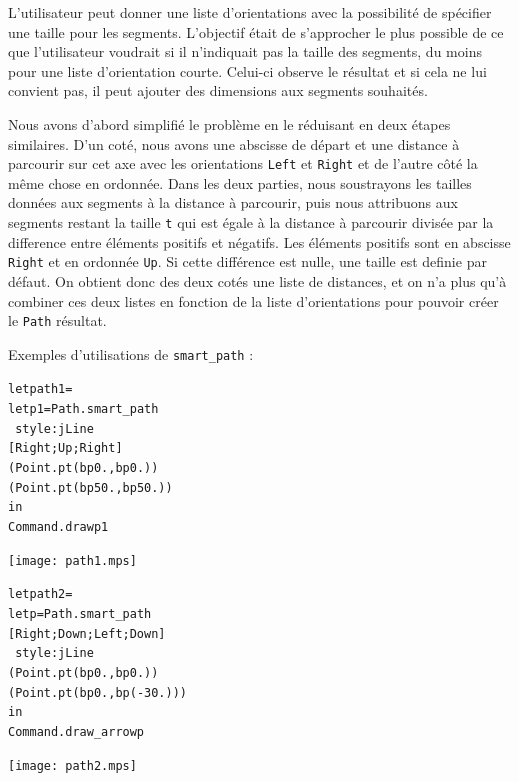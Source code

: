 \documentclass[a4paper,12pt]{article}
\begin{document}
L'utilisateur peut donner une liste d'orientations avec la possibilité de spécifier une taille pour les segments.
L'objectif était de s'approcher le plus possible de ce que l'utilisateur voudrait si il n'indiquait pas la taille des segments, du moins pour une liste d'orientation courte. 
Celui-ci observe le résultat et si cela ne lui convient pas, il peut ajouter des dimensions aux segments souhaités.
\bigskip

Nous avons d'abord simplifié le problème en le réduisant en deux étapes similaires.
D'un coté, nous avons une abscisse de départ et une distance à parcourir sur cet axe avec les orientations \texttt{Left} et \texttt{Right} et de l'autre côté la même chose en ordonnée.
Dans les deux parties, nous soustrayons les tailles données aux segments à la distance à parcourir, puis nous attribuons aux segments restant la taille \texttt{t} qui est égale à la distance à parcourir divisée par la difference entre éléments positifs et négatifs.
Les éléments positifs sont en abscisse \texttt{Right} et en ordonnée \texttt{Up}. Si cette différence est nulle, une taille est definie par défaut. 
On obtient donc des deux cotés une liste de distances, et on n'a plus qu'à combiner ces deux listes en fonction de la liste d'orientations pour pouvoir créer le \texttt{Path} résultat.


\bigskip 

Exemples d'utilisations de \texttt{smart\_path} :
\bigskip

\begin{minipage}{0.5\linewidth}
  \begin{alltt}
    let path1 = 
    let p1 = Path.smart_path 
    ~style:jLine
    [Right;Up;Right]
    (Point.pt (bp 0.,bp 0.)) 
    (Point.pt (bp 50.,bp 50.))
    in
    Command.draw p1
  \end{alltt}
\end{minipage}
\begin{minipage}{0.5\linewidth}
\begin{center}
\texttt{[image: path1.mps]}
\end{center}
\end{minipage}

\bigskip
\begin{minipage}{0.5\linewidth}
  \begin{alltt}
    let path2 = 
  let p = Path.smart_path 
    [Right;Down;Left;Down]
    ~style:jLine
    (Point.pt (bp 0.,bp 0.)) 
    (Point.pt (bp 0.,bp (-30.)))
  in
  Command.draw_arrow p
  \end{alltt}
\end{minipage}
\begin{minipage}{0.5\linewidth}
\begin{center}
\texttt{[image: path2.mps]}
\end{center}
\end{minipage}
\end{document}
